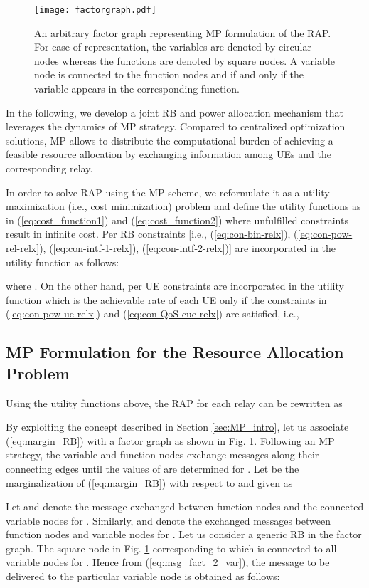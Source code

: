 \documentclass[twocolumn,10pt]{IEEEtran}
\begin{document}
\begin{figure}[!t]
\centering
\texttt{[image: factorgraph.pdf]}
\caption{An arbitrary factor graph representing MP formulation of the RAP. For ease of representation, the variables are denoted by circular nodes whereas the functions are denoted by square nodes. A variable node  is connected to the function nodes  and  if and only if the variable appears in the corresponding function.} 
\label{fig:factorgraph}
\end{figure}

In the following, we develop a joint RB and power allocation mechanism that leverages the dynamics of MP strategy. Compared to centralized optimization solutions, MP allows to distribute the computational burden of achieving a feasible resource allocation by exchanging information among UEs and the corresponding relay.

In order to solve RAP  using the MP scheme, we reformulate it as a utility maximization (i.e., cost minimization) problem and define the utility functions as in (\ref{eq:cost_function1}) and (\ref{eq:cost_function2}) where unfulfilled constraints result in infinite cost. Per RB constraints [i.e., (\ref{eq:con-bin-relx}), (\ref{eq:con-pow-rel-relx}), (\ref{eq:con-intf-1-relx}), (\ref{eq:con-intf-2-relx})] are incorporated in the utility function  as follows:

where . On the other hand, per UE constraints are incorporated in the utility function  which is the achievable rate of each UE only if the constraints in (\ref{eq:con-pow-ue-relx}) and (\ref{eq:con-QoS-cue-relx}) are satisfied, i.e., 


\subsection{MP Formulation for the Resource Allocation Problem}

Using the utility functions above, the RAP for each relay  can be rewritten as



By exploiting the concept  described in Section \ref{sec:MP_intro}, let us associate (\ref{eq:margin_RB}) with a factor graph as shown in Fig. \ref{fig:factorgraph}. Following an MP strategy, the variable and function nodes exchange messages along their connecting edges until the values of   are determined for . Let  be the marginalization of (\ref{eq:margin_RB}) with respect to  and given as


Let   and  denote
the message exchanged between  function nodes  and the connected variable nodes for . Similarly, 
and  denote the  exchanged messages between  function nodes  and variable nodes for . Let us consider a generic RB  in the factor graph. The square node in Fig. \ref{fig:factorgraph} corresponding  to  which is connected to all variable nodes  for . Hence from (\ref{eq:msg_fact_2_var}), the message to be delivered to the particular variable node  is obtained as follows:
\end{document}
